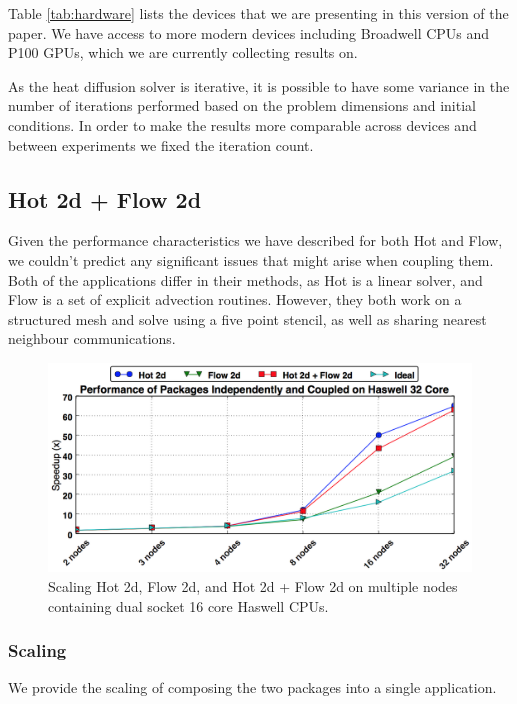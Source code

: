 \documentclass[runningheads,a4paper]{llncs}
\begin{document}
Table \ref{tab:hardware} lists the devices that we are presenting in this version of the paper. We have access to more modern devices including Broadwell CPUs and P100 GPUs, which we are currently collecting results on. 

As the heat diffusion solver is iterative, it is possible to have some variance in the number of iterations performed based on the problem dimensions and initial conditions. In order to make the results more comparable across devices and between experiments we fixed the iteration count.

\subsection{Hot 2d + Flow 2d}

Given the performance characteristics we have described for both Hot and Flow, we couldn't predict any significant issues that might arise when coupling them. Both of the applications differ in their methods, as Hot is a linear solver, and Flow is a set of explicit advection routines. However, they both work on a structured mesh and solve using a five point stencil, as well as sharing nearest neighbour communications.


\begin{figure}
  \centering
  \includegraphics[width=1.0\linewidth]{cpu_results}
  \caption{Scaling Hot 2d, Flow 2d, and Hot 2d + Flow 2d on multiple nodes containing dual socket 16 core Haswell CPUs.}
  \label{fig:scaling-hot-flow-haswell}
\end{figure}
\subsubsection{Scaling}

We provide the scaling of composing the two packages into a single application.
\end{document}
